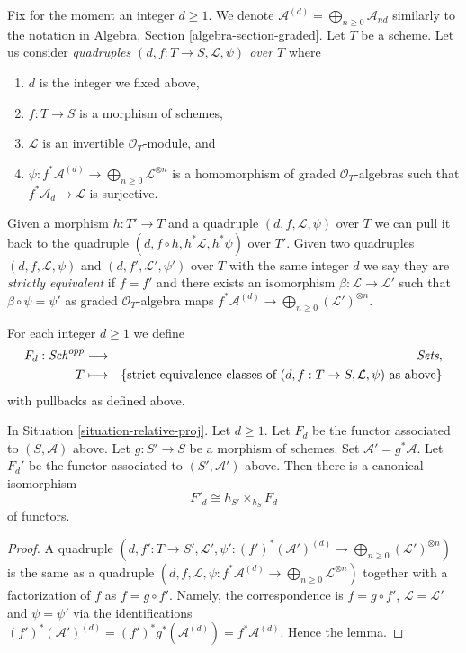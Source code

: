 \medskip\noindent
Fix for the moment an integer $d \geq 1$.
We denote $\mathcal{A}^{(d)} = \bigoplus_{n \geq 0} \mathcal{A}_{nd}$
similarly to the notation in Algebra, Section \ref{algebra-section-graded}.
Let $T$ be a scheme.
Let us consider {\it quadruples $(d, f : T \to S, \mathcal{L}, \psi)$
over $T$} where
\begin{enumerate}
\item $d$ is the integer we fixed above,
\item $f : T \to S$ is a morphism of schemes,
\item $\mathcal{L}$ is an invertible $\mathcal{O}_T$-module, and
\item
$\psi : f^*\mathcal{A}^{(d)} \to \bigoplus_{n \geq 0}\mathcal{L}^{\otimes n}$
is a homomorphism of graded $\mathcal{O}_T$-algebras
such that $f^*\mathcal{A}_d \to \mathcal{L}$ is surjective.
\end{enumerate}
Given a morphism $h : T' \to T$ and a quadruple
$(d, f, \mathcal{L}, \psi)$ over $T$ we can pull it back to the
quadruple $(d, f \circ h, h^*\mathcal{L}, h^*\psi)$ over $T'$.
Given two quadruples $(d, f, \mathcal{L}, \psi)$ and
$(d, f', \mathcal{L}', \psi')$ over $T$ with the same integer $d$
we say they are {\it strictly equivalent} if $f = f'$ and there exists
an isomorphism $\beta : \mathcal{L} \to \mathcal{L}'$
such that $\beta \circ \psi = \psi'$ as graded $\mathcal{O}_T$-algebra maps
$f^*\mathcal{A}^{(d)} \to \bigoplus_{n \geq 0} (\mathcal{L}')^{\otimes n}$.

\medskip\noindent
For each integer $d \geq 1$ we define
\begin{eqnarray*}
F_d : \mathit{Sch}^{opp} & \longrightarrow & \textit{Sets}, \\
T & \longmapsto &
\{\text{strict equivalence classes of }
(d, f : T \to S, \mathcal{L}, \psi)
\text{ as above}\}
\end{eqnarray*}
with pullbacks as defined above.

\begin{lemma}
\label{lemma-proj-base-change}
In Situation \ref{situation-relative-proj}. Let $d \geq 1$.
Let $F_d$ be the functor
associated to $(S, \mathcal{A})$ above.
Let $g : S' \to S$ be a morphism of schemes.
Set $\mathcal{A}' = g^*\mathcal{A}$. Let $F_d'$ be the
functor associated to $(S', \mathcal{A}')$ above.
Then there is a canonical isomorphism
$$
F'_d \cong h_{S'} \times_{h_S} F_d
$$
of functors.
\end{lemma}

\begin{proof}
A quadruple
$(d, f' : T \to S', \mathcal{L}',
\psi' : (f')^*(\mathcal{A}')^{(d)} \to
\bigoplus_{n \geq 0} (\mathcal{L}')^{\otimes n})$
is the same as a quadruple
$(d, f, \mathcal{L},
\psi : f^*\mathcal{A}^{(d)} \to
\bigoplus_{n \geq 0} \mathcal{L}^{\otimes n})$
together with a factorization of $f$ as $f = g \circ f'$. Namely,
the correspondence is $f = g \circ f'$, $\mathcal{L} = \mathcal{L}'$
and $\psi = \psi'$ via the identifications
$(f')^*(\mathcal{A}')^{(d)} = (f')^*g^*(\mathcal{A}^{(d)}) =
f^*\mathcal{A}^{(d)}$. Hence the lemma.
\end{proof}

